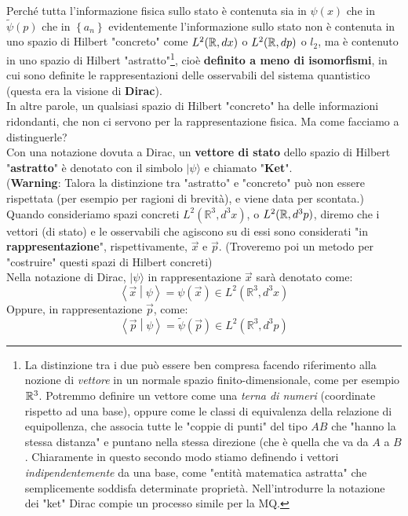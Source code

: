 \documentclass[FisicaTeorica.tex]{subfiles}
\begin{document}
Perché tutta l'informazione fisica sullo stato è contenuta sia in $\psi(x)$ che in $\tilde{\psi}(p)$ che in $\left\{a_n\right\}$ evidentemente l'informazione sullo stato non è contenuta in uno spazio di Hilbert "concreto" come $L^2(\mathbb{R},dx)$ o $L^2(\mathbb{R},dp)$ o $l_2$, ma è contenuto in uno spazio di Hilbert "astratto"\footnote{La distinzione tra i due può essere ben compresa facendo riferimento alla nozione di \textit{vettore} in un normale spazio finito-dimensionale, come per esempio $\mathbb{R}^3$. Potremmo definire un vettore come una \textit{terna di numeri} (coordinate rispetto ad una base), oppure come le classi di equivalenza della relazione di equipollenza, che associa tutte le "coppie di punti" del tipo $AB$ che "hanno la stessa distanza" e puntano nella stessa direzione (che è quella che va da $A$ a $B$. Chiaramente in questo secondo modo stiamo definendo i vettori \textit{indipendentemente} da una base, come "entità matematica astratta" che semplicemente soddisfa determinate proprietà. Nell'introdurre la notazione dei "ket" Dirac compie un processo simile per la MQ.}, cioè \textbf{definito a meno di isomorfismi}, in cui sono definite le rappresentazioni delle osservabili del sistema quantistico (questa era la visione di \textbf{Dirac}).\\
In altre parole, un qualsiasi spazio di Hilbert "concreto" ha delle informazioni ridondanti, che non ci servono per la rappresentazione fisica. Ma come facciamo a distinguerle?\\

Con una notazione dovuta a Dirac, un \textbf{vettore di stato} dello spazio di Hilbert "\textbf{astratto}" è denotato con il simbolo $|\psi\rangle$  e chiamato "\textbf{Ket}".\\ 
(\textbf{Warning}: Talora la distinzione tra "astratto" e "concreto" può non essere rispettata (per esempio per ragioni di brevità), e viene data per scontata.)\\
Quando consideriamo spazi concreti $L^2(\mathbb{R}^3,d^3x)$, o $L^2(\mathbb{R},d^3p)$, diremo che i vettori (di stato) e le osservabili che agiscono su di essi sono considerati "in \textbf{rappresentazione}", rispettivamente, $\vec{x}$ e $\vec{p}$. (Troveremo poi un metodo per "costruire" questi spazi di Hilbert concreti)\\
Nella notazione di Dirac, $|\psi\rangle$ in rappresentazione $\vec{x}$ sarà denotato come:
\[
\left\langle\vec{x}\middle|\psi\right\rangle=\psi \left(\vec{x}\right)\in L^2(\mathbb{R}^3,d^3x)
\]
Oppure, in rappresentazione $\vec{p}$, come:
\[
\left\langle\vec{p}\middle|\psi\right\rangle=\tilde{\psi}\left(\vec{p}\right)\in L^2(\mathbb{R}^3,d^3p)
\]
\end{document}
